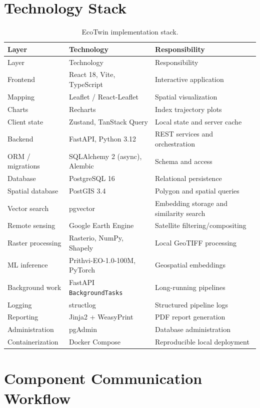 \documentclass[12pt,a4paper,oneside]{report}
\newcommand{\code}[1]{\texttt{#1}}
\begin{document}
\section{Technology Stack}

\begin{longtable}{@{}l l p{}@{}}
\caption{EcoTwin implementation stack.}
\label{tab:stack} \\
\toprule
Layer & Technology & Responsibility \\
\midrule
\endfirsthead
\toprule
Layer & Technology & Responsibility \\
\midrule
\endhead
\bottomrule
\endfoot
Frontend & React 18, Vite, TypeScript & Interactive application \\
Mapping & Leaflet / React-Leaflet & Spatial visualization \\
Charts & Recharts & Index trajectory plots \\
Client state & Zustand, TanStack Query & Local state and server cache \\
Backend & FastAPI, Python 3.12 & REST services and orchestration \\
ORM / migrations & SQLAlchemy 2 (async), Alembic & Schema and access \\
Database & PostgreSQL 16 & Relational persistence \\
Spatial database & PostGIS 3.4 & Polygon and spatial queries \\
Vector search & pgvector & Embedding storage and similarity search \\
Remote sensing & Google Earth Engine & Satellite filtering/compositing \\
Raster processing & Rasterio, NumPy, Shapely & Local GeoTIFF processing \\
ML inference & Prithvi-EO-1.0-100M, PyTorch & Geospatial embeddings \\
Background work & FastAPI \code{BackgroundTasks} & Long-running pipelines \\
Logging & structlog & Structured pipeline logs \\
Reporting & Jinja2 + WeasyPrint & PDF report generation \\
Administration & pgAdmin & Database administration \\
Containerization & Docker Compose & Reproducible local deployment \\
\end{longtable}

\section{Component Communication Workflow}
\label{sec:component_workflow}
\end{document}
